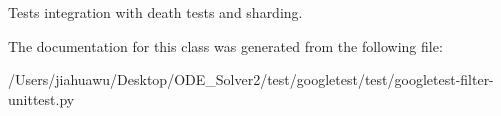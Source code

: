 \begin{DoxyVerb}Tests integration with death tests and sharding.\end{DoxyVerb}
 

The documentation for this class was generated from the following file\+:\begin{DoxyCompactItemize}
\item 
/\+Users/jiahuawu/\+Desktop/\+O\+D\+E\+\_\+\+Solver2/test/googletest/test/googletest-\/filter-\/unittest.\+py\end{DoxyCompactItemize}
